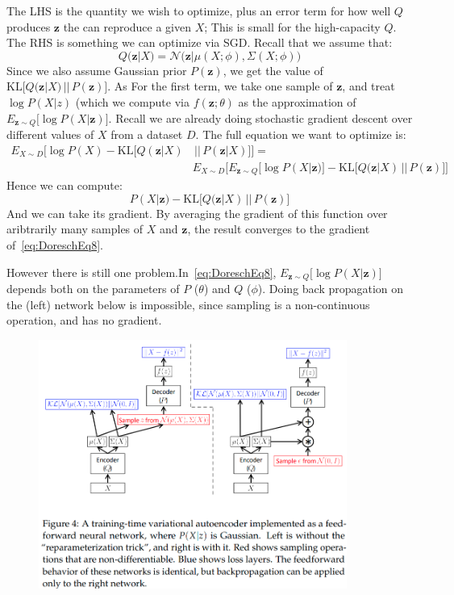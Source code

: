 \documentclass{article}
\begin{document}
The LHS is the quantity we wish to optimize, plus an error term for how well $Q$ produces $\bm{z}$ the can reproduce a given $X$; This is small for the high-capacity $Q$. The RHS is something we can optimize via SGD. Recall that we assume that:
\[
  Q(\bm{z}|X) = \mathcal{N}\big(\bm{z} | \mu(X ; \phi), \Sigma(X ; \phi) \big)
\]
Since we also assume Gaussian prior $P(\bm{z})$, we get the value of $\mathrm{KL} \Big[ Q( \bm{z} | X) \,||\, P(\bm{z}) \Big]$. 
As For the first term, we take one sample of $\bm{z}$, and treat $\log P(X|z)$ (which we compute via $f(\bm{z} ; \theta)$ as the approximation of $E_{\bm{z} \sim  Q} \big[ \log P(X | \bm{z}) \big]$. 
Recall we are already doing stochastic gradient descent over different values of $X$ from a dataset $D$. The full equation we want to optimize is:
\begin{equation} \label{eq:DoreschEq8}
\begin{aligned}
  E_{X \sim  D} \Big[   \log P(X) - \mathrm{KL} \Big[ Q(\bm{z} | X) &\,||\, P(\bm{z} | X)  \Big] \Big] =\\
  & E_{X \sim  D} \Big[  E_{\bm{z} \sim  Q} \big[ \log P(X| \bm{z}) \big] - \mathrm{KL} \big[ Q(\bm{z} | X) \,||\, P(\bm{z}) \big] \Big] 
\end{aligned}
\end{equation}
Hence we can compute:
\[
  P(X | \bm{z}) - \mathrm{KL} \Big[ Q(\bm{z} | X) \,||\, P(\bm{z}) \Big]
\]
And we can take its gradient. By averaging the gradient of this function over aribtrarily many samples of $X$ and $\bm{z}$, the result converges to the gradient of~\cref{eq:DoreschEq8}. 


However there is still one problem.In~\cref{eq:DoreschEq8}, $E_{\bm{z} \sim  Q} \big[ \log P(X | \bm{z}) \big]$ depends both on the parameters of $P$ ($\theta$) and $Q$ ($\phi$). Doing back propagation on the (left) network below is impossible, since sampling is a non-continuous operation, and has no gradient. 
\begin{figure}[H] \centering \includegraphics[height=0.3\textheight,width=0.9\textwidth,keepaspectratio]{DoreschReparamTrick} \label{fig:DoreschReparamTrick} \end{figure}
\end{document}
